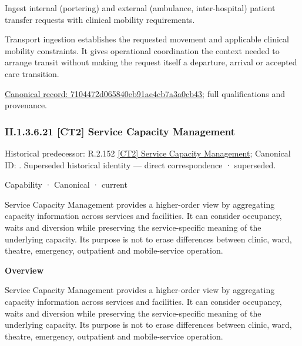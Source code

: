 Ingest internal (portering) and external (ambulance, inter-hospital) patient transfer requests with clinical mobility requirements.



Transport ingestion establishes the requested movement and applicable clinical mobility constraints. It gives operational coordination the context needed to arrange transit without making the request itself a departure, arrival or accepted care transition.


{\footnotesize \href{../../../../../../../continuum/strategy/capability/feature/7104472d065840eb91ae4cb7a3a0cb43.md}{Canonical record: 7104472d065840eb91ae4cb7a3a0cb43}; full qualifications and provenance.}\par
\subsubsection*{II.1.3.6.21 [CT2] Service Capacity Management}
\label{navigation:II.1.3.6.21}

{\small Historical predecessor: R.2.152 \hyperref[element:ac205f374c9d41c3b6d18a6b7c356152]{[CT2] Service Capacity Management}; Canonical ID: \texttt{}. Superseded historical identity — direct correspondence · superseded.}\par
\label{element:d86105bf9c86445394088f65c895d37f}
{\small Capability · Canonical · current}\par

Service Capacity Management provides a higher-order view by aggregating capacity information across services and facilities. It can consider occupancy, waits and diversion while preserving the service-specific meaning of the underlying capacity. Its purpose is not to erase differences between clinic, ward, theatre, emergency, outpatient and mobile-service operation.



\textbf{Overview}



Service Capacity Management provides a higher-order view by aggregating capacity information across services and facilities. It can consider occupancy, waits and diversion while preserving the service-specific meaning of the underlying capacity. Its purpose is not to erase differences between clinic, ward, theatre, emergency, outpatient and mobile-service operation.



